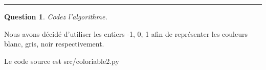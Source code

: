 \documentclass[a4paper,12pt]{article}
\newtheorem{exo}{Question}
\begin{document}
\\\\

\noindent\rule{\textwidth}{1pt}


\begin{exo}
	Codez l'algorithme.
\end{exo}

Nous avons décidé d'utiliser les entiers -1, 0, 1 afin de représenter les couleurs blanc, gris, noir respectivement.\par
Le code source est src/coloriable2.py\\\\
\end{document}
